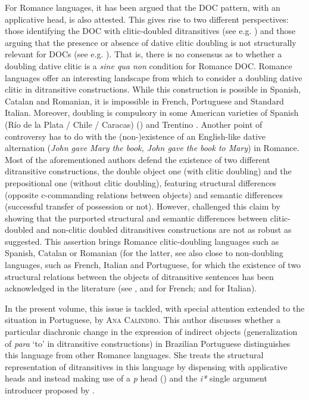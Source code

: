 \documentclass[output=paper,modfonts,nonflat,colorlinks,citecolor=brown]{langsci/langscibook}
\begin{document}
For Romance languages, it has been argued that the DOC pattern, with an applicative head, is also attested. This gives rise to two different perspectives: those identifying the DOC with clitic-doubled ditransitives (see e.g. \citealt{Cuervo2003}) and those arguing that the presence or absence of dative clitic doubling is not structurally relevant for DOCs (see e.g. \citealt{Pineda2013, Pineda2016, Pineda2020}). That is, there is no consensus as to whether a doubling dative clitic is a {\textit{sine qua non}} condition for Romance DOC. Romance languages offer an interesting landscape from which to consider a doubling dative clitic in ditransitive constructions. While this construction is possible in Spanish, Catalan and Romanian, it is impossible in French, Portuguese and Standard Italian. Moreover, doubling is compulsory in some American varieties of Spanish (Río de la Plata / Chile / Caracas) (\citealt{Parodi1998,Senn2008,Pujalte2009}) and Trentino \citep{Cordin1993}. Another point of controversy has to do with the (non-)existence of an English-like dative alternation (\textit{John gave Mary the book, John gave the book to Mary}) in Romance. Most of the aforementioned authors defend the existence of two different ditransitive constructions, the double object one (with clitic doubling) and the prepositional one (without clitic doubling), featuring structural differences (opposite c-commanding relations between objects) and semantic differences (successful transfer of possession or not). However, \citet{Pineda2013,Pineda2016,Pineda2020} challenged this claim by showing that the purported structural and semantic differences between clitic-doubled and non-clitic doubled ditransitives constructions are not as robust as suggested. This assertion brings Romance clitic-doubling languages such as Spanish, Catalan or Romanian (for the latter, see also \citet{vonHeusingerTigău2020} close to non-doubling languages, such as French, Italian and Portuguese, for which the existence of two structural relations between the objects of ditransitive sentences has been acknowledged in the literature (see \citealt{Harley2002,Anagnostopoulou2003,Fournier2010}, and \citealt{BonehNash2011} for French; and \citealt{GiorgiLongobardi1991,McGinnis2001,Harley2002} for Italian).



In the present volume, this issue is tackled, with special attention extended to the situation in Portuguese, by {\textsc{Ana Calindro.}}  This author discusses whether a particular diachronic change in the expression of indirect objects (generalization of {\textit{para}} ‘to’ in ditransitive constructions) in Brazilian Portuguese distinguishes this language from other Romance languages. She treats the structural representation of ditransitives in this language by dispensing with applicative heads and instead making use of a {\textit{p}} head (\citealt{Svenonius2003, Svenonius2004Arguments, Wood2012}) and the {\textit{i*}} single argument introducer proposed by \citet{WoodMarantz2017}.
\end{document}

